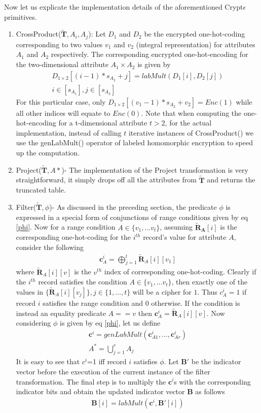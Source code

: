 Now let us explicate the implementation details of the aforementioned Crypt$\epsilon$ primitives. 
\begin{enumerate}\item CrossProduct($\tilde{\mathbf{T}}, A_i, A_j$): Let $D_1$ and $D_2$  be the encrypted one-hot-coding corresponding to two  values $v_1$ and $v_2$ (integral representation) for attributes $A_1$ and $A_2$ respectively. The corresponding encrypted one-hot-encoding for the two-dimensional attribute $A_1\times A_2$ is given by  \begin{gather} D_{1\times 2}[(i-1)*s_{A_2}+j] = labMult(D_1[i], D_2[j])\\ i \in [s_{A_1}], j \in [s_{A_2}]\end{gather} For this particular case, only $D_{1 \times 2}[(v_1-1)*s_{A_2}+v_2]=Enc(1)$ while all other indices will equate to $Enc(0)$. Note that when computing the one-hot-encoding for a t-dimensional attribute $t > 2$,  for the actual implementation, instead of calling $t$ iterative instances of CrossProduct() we use the genLabMult() operator of labeled homomorphic encryption to speed up the computation. \item Project($\tilde{\mathbf{T}}, A*$)- The implementation of the Project transformation is very straightforward, it simply drops off all the attributes from $\tilde{\mathbf{T}}$ and returns the truncated table. \item Filter($\mathbf{\tilde{T}},\phi$)-  As discussed in the preceding section, the predicate $\phi$ is expressed in a special form of conjunctions of range conditions given by eq \ref{phi}. Now for a range condition $A \in \{v_1,...v_t\}$, assuming $\mathbf{\tilde{R}_A}[i]$ is the corresponding one-hot-coding for the $i^{th}$ record's value for attribute $A$,  consider the following \begin{gather}\mathbf{c}_A^i=\bigoplus_{j=1}^{t}\tilde{\mathbf{R}}_{A}[i][v_1]\end{gather} where $\tilde{\mathbf{R}}_{A}[i][v]$ is the $v^{th}$ index of corresponding one-hot-coding. Clearly if the $i^{th}$ record satisfies the condition $A \in \{v_1,...v_t\}$, then exactly one of the values in $\{\tilde{\mathbf{R}}_{A}[i][v_j]\}, j \in \{1,...,t\}$ will be a cipher for $1$. Thus $c_A^i=1$ if record $i$ satisfies the range condition and 0 otherwise. If the condition is instead an equality predicate $A==v$ then $\mathbf{c}_A^i=\tilde{\mathbf{R}}_{A}[i][v]$. Now considering $\phi$ is given by eq \ref{phi}, let us define\begin{gather}\mathbf{c}^i=genLabMult(\mathbf{c}^i_{A1},...,\mathbf{c}^i_{Ar})\\A^*=\bigcup_{j=1}^rA_j\end{gather} It is easy to see that $c^i$=1 iff record $i$ satisfies $\phi$. Let $\mathbf{B}'$ be the indicator vector before the execution of the current instance of the filter transformation. The final step is to multiply the $\mathbf{c}^i$s with the corresponding indicator bits and obtain the updated indicator vector $\mathbf{B}$ as follows \begin{gather}\mathbf{B}[i]=labMult(\mathbf{c}^i,\mathbf{B}'[i])\end{gather} 

\end{enumerate}
